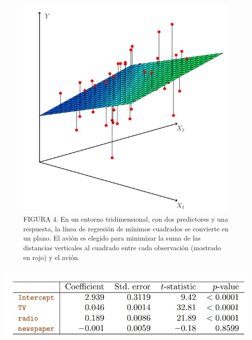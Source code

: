 \documentclass[
  letterpaper,
  DIV=11,
  numbers=noendperiod]{scrartcl}
\begin{document}
\begin{figure}

{\centering \includegraphics{images/sd.jpg}

}

\caption{FIGURA 4. En un entorno tridimensional, con dos predictores y
una respuesta, la línea de regresión de mínimos cuadrados se convierte
en un plano. El avión es elegido para minimizar la suma de las
distancias verticales al cuadrado entre cada observación (mostrado en
rojo) y el avión.}

\end{figure}

\hypertarget{tabla-4.-para-los-datos-de-publicidad-las-estimaciones-del-coeficiente-de-muxednimos-cuadrados-de-la-regresiuxf3n-lineal-muxfaltiple-del-nuxfamero-de-unidades-vendidas-en-televisiuxf3n-radio-y-periuxf3dicos-presupuestos-publicitarios}{%
\subsubsection{\texorpdfstring{\protect\includegraphics{images/te4.jpg}}{TABLA 4. Para los datos de publicidad, las estimaciones del coeficiente de mínimos cuadrados de la regresión lineal múltiple del número de unidades vendidas en televisión, radio y periódicos presupuestos publicitarios}}\label{tabla-4.-para-los-datos-de-publicidad-las-estimaciones-del-coeficiente-de-muxednimos-cuadrados-de-la-regresiuxf3n-lineal-muxfaltiple-del-nuxfamero-de-unidades-vendidas-en-televisiuxf3n-radio-y-periuxf3dicos-presupuestos-publicitarios}}
\end{document}
